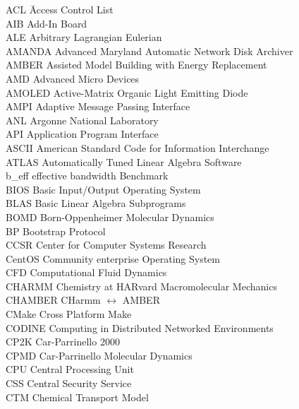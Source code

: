 %
\begin{tabbing}
ACL     \hspace{0.60in} \= Access Control List\\
AIB     \> Add-In Board\\
ALE     \> Arbitrary Lagrangian Eulerian\\
AMANDA  \> Advanced Maryland Automatic Network Disk Archiver\\
AMBER   \> Assisted Model Building with Energy Replacement\\
AMD     \> Advanced Micro Devices\\
AMOLED  \> Active-Matrix Organic Light Emitting Diode\\
AMPI    \> Adaptive Message Passing Interface\\
ANL     \> Argonne National Laboratory\\
API     \> Application Program Interface\\
ASCII   \> American Standard Code for Information Interchange\\
ATLAS   \> Automatically Tuned Linear Algebra Software\\
b\_eff  \> effective bandwidth Benchmark\\
BIOS    \> Basic Input/Output Operating System\\
BLAS    \> Basic Linear Algebra Subprograms\\
BOMD    \> Born-Oppenheimer Molecular Dynamics\\
BP      \> Bootstrap Protocol\\
CCSR    \> Center for Computer Systems Research\\
CentOS  \> Community enterprise Operating System\\
CFD     \> Computational Fluid Dynamics\\
CHARMM  \> Chemistry at HARvard Macromolecular Mechanics\\
CHAMBER \> CHarmm $\leftrightarrow$ AMBER\\
CMake   \> Cross Platform Make\\
CODINE  \> Computing in Distributed Networked Environments\\
CP2K    \> Car-Parrinello 2000\\
CPMD    \> Car-Parrinello Molecular Dynamics\\
CPU     \> Central Processing Unit\\
CSS     \> Central Security Service\\
CTM     \> Chemical Transport Model\\

\end{tabbing}
